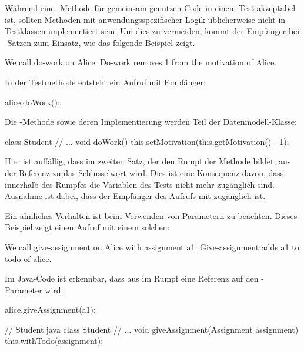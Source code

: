 Während eine -Methode für gemeinsam genutzen Code in einem Test akzeptabel ist, sollten Methoden mit anwendungsspezifischer Logik üblicherweise nicht in Testklassen implementiert sein.
Um dies zu vermeiden, kommt der Empfänger bei -Sätzen zum Einsatz, wie das folgende Beispiel zeigt.

\begin{codeblock}
    We call do-work on Alice.
    Do-work removes 1 from the motivation of Alice.
\end{codeblock}

In der Testmethode entsteht ein Aufruf mit Empfänger:

\begin{jcodeblock}
    alice.doWork();
\end{jcodeblock}

Die -Methode sowie deren Implementierung werden Teil der Datenmodell-Klasse:

\begin{jcodeblock}
    class Student {
        // ...
        void doWork() {
            this.setMotivation(this.getMotivation() - 1);
        }
    }
\end{jcodeblock}

Hier ist auffällig, dass im zweiten Satz, der den Rumpf der Methode bildet, aus der Referenz zu  das Schlüsselwort  wird.
Dies ist eine Konsequenz davon, dass innerhalb des Rumpfes die Variablen des Tests nicht mehr zugänglich sind.
Ausnahme ist dabei, dass der Empfänger des Aufrufs mit  zugänglich ist.

Ein ähnliches Verhalten ist beim Verwenden von Parametern zu beachten.
Dieses Beispiel zeigt einen Aufruf mit einem solchen:

\begin{codeblock}
    We call give-assignment on Alice with assignment a1.
    Give-assignment adds a1 to todo of alice.
\end{codeblock}

Im Java-Code ist erkennbar, dass aus  im Rumpf eine Referenz auf den -Parameter wird:

\begin{jcodeblock}
    alice.giveAssignment(a1);

    // Student.java
    class Student {
        // ...
        void giveAssignment(Assignment assignment) {
            this.withTodo(assignment);
        }
    }
\end{jcodeblock}

